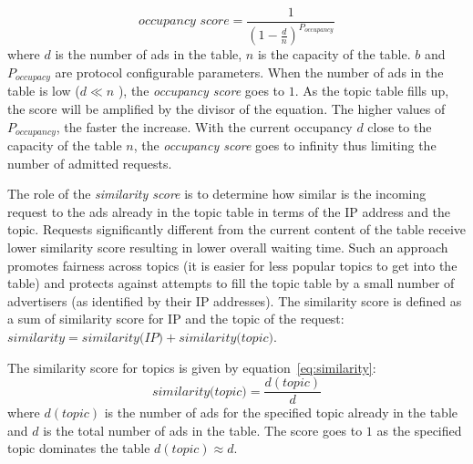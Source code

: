 \begin{equation}
\label{eq:occupancy}
    \textit{occupancy score} = \frac{1}{(1-\frac{d}{n})^{P_{occupancy}}}
\end{equation}
where $d$ is the number of ads in the table, $n$ is the capacity of the table. $b$ and $P_{occupacy}$ are protocol configurable parameters. 
When the number of ads in the table is low ($d \ll n$ ), the \emph{occupancy score} goes to $1$. 
As the topic table fills up, the score will be amplified by the divisor of the equation. 
The higher values of $P_{occupancy}$, the faster the increase. 
With the current occupancy $d$ close to the capacity of the table $n$, the \emph{occupancy score} goes to infinity thus limiting the number of admitted requests.

The role of the \emph{similarity score} is to determine how similar is the incoming request to the ads already in the topic table in terms of the IP address and the topic. 
Requests significantly different from the current content of the table receive lower similarity score resulting in lower overall waiting time. 
Such an approach promotes fairness across topics (it is easier for less popular topics to get into the table) and protects against attempts to fill the topic table by a small number of advertisers (as identified by their IP addresses). The similarity score is defined as a sum of similarity score for IP and the topic of the request: $\textit{similarity} = \textit{similarity(IP)} + \textit{similarity(topic)}$. 

The similarity score for topics is given by equation~\ref{eq:similarity}:
\begin{equation}
\label{eq:similarity}
    \textit{similarity(topic)}= \frac{d(topic)}{d}
\end{equation}
where $d(topic)$ is the number of ads for the specified topic already in the table and $d$ is the total number of ads in the table. 
The score goes to $1$ as the specified topic dominates the table $d(topic)  \approx  d$. 

